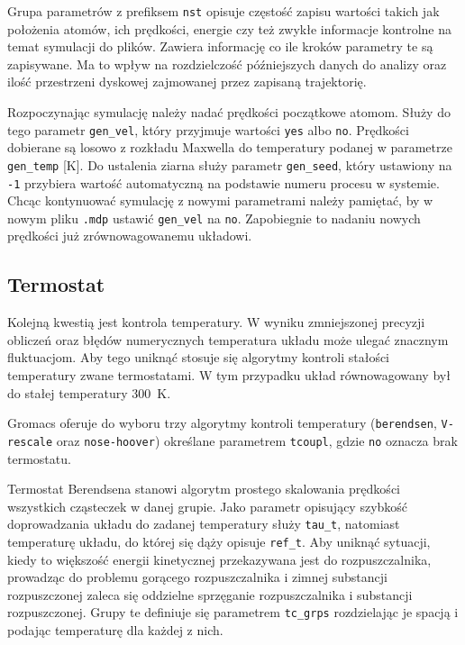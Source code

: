 Grupa parametrów z prefiksem \texttt{nst} opisuje częstość zapisu wartości takich jak położenia atomów, ich prędkości, energie czy też zwykłe informacje kontrolne na temat symulacji do plików. Zawiera informację co ile kroków parametry te są zapisywane. Ma to wpływ na rozdzielczość późniejszych danych do analizy oraz ilość przestrzeni dyskowej zajmowanej przez zapisaną trajektorię. 

Rozpoczynając symulację należy nadać prędkości początkowe atomom. Służy do tego parametr \texttt{gen\_vel}, który przyjmuje wartości \texttt{yes} albo \texttt{no}. Prędkości dobierane są losowo z rozkładu Maxwella do temperatury podanej w parametrze \texttt{gen\_temp} [K]. Do ustalenia ziarna służy parametr \texttt{gen\_seed}, który ustawiony na \texttt{-1} przybiera wartość automatyczną na podstawie numeru procesu w systemie. Chcąc kontynuować symulację z nowymi parametrami należy pamiętać, by w nowym pliku \texttt{.mdp} ustawić \texttt{gen\_vel} na \texttt{no}. Zapobiegnie to nadaniu nowych prędkości już zrównowagowanemu układowi.

\subsection{Termostat}

Kolejną kwestią jest kontrola temperatury. W wyniku zmniejszonej precyzji obliczeń oraz błędów numerycznych temperatura układu może ulegać znacznym fluktuacjom. Aby tego uniknąć stosuje się algorytmy kontroli stałości temperatury zwane termostatami. W tym przypadku układ równowagowany był do stałej temperatury 300~K. 

Gromacs oferuje do wyboru trzy algorytmy kontroli temperatury (\texttt{berendsen}, \texttt{V-rescale} oraz \texttt{nose-hoover}) określane parametrem \texttt{tcoupl}, gdzie \texttt{no} oznacza brak termostatu. 

Termostat Berendsena stanowi algorytm prostego skalowania prędkości wszystkich cząsteczek w danej grupie. Jako parametr opisujący szybkość doprowadzania układu do zadanej temperatury służy \texttt{tau\_t}, natomiast temperaturę układu, do której się dąży opisuje \texttt{ref\_t}. Aby uniknąć sytuacji, kiedy to większość energii kinetycznej przekazywana jest do rozpuszczalnika, prowadząc do problemu gorącego rozpuszczalnika i zimnej substancji rozpuszczonej zaleca się oddzielne sprzęganie rozpuszczalnika i substancji rozpuszczonej. Grupy te definiuje się parametrem \texttt{tc\_grps} rozdzielając je spacją i podając temperaturę dla każdej z nich.

